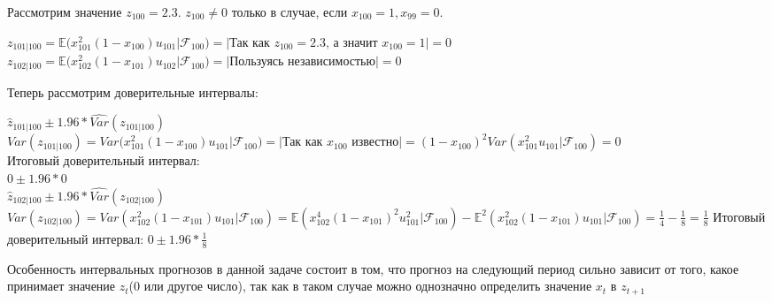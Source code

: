 \documentclass[a4paper,14pt]{article}
\begin{document}
\begin{enumerate}
\begin{enumerate}[label=\alph*)]
Рассмотрим значение $z_{100} = 2.3$. $z_{100}\neq 0$ только в случае, если $x_{100} = 1, x_{99} = 0$.
	\begin{spacing}{1.5}
		$z_{101|100} = \mathbb{E}(x^2_{101}(1-x_{100})u_{101}|\mathcal{F}_{100}) = |\texttt{Так как $z_{100} = 2.3$, а значит $x_{100} = 1$}| = 0$\\
		$z_{102|100} = \mathbb{E}(x^2_{102}(1-x_{101})u_{102}|\mathcal{F}_{100}) = |\texttt{Пользуясь независимостью}| = 0$
	\end{spacing}
Теперь рассмотрим доверительные интервалы:
	\begin{spacing}{1.5}
		$\hat{z}_{101|100} \pm 1.96*\hat{Var}(z_{101|100})$\\
		$Var(z_{101|100}) = Var(x^2_{101}(1-x_{100})u_{101}|\mathcal{F}_{100}) = |\texttt{Так как $x_{100}$ известно}| = (1-x_{100})^2Var(x^2_{101}u_{101}|\mathcal{F}_{100}) = 0$\\
		Итоговый доверительный интервал:\\
		$0 \pm 1.96*0$\\
		$\hat{z}_{102|100} \pm 1.96*\hat{Var}(z_{102|100})$\\
		$Var(z_{102|100}) = Var(x^2_{102}(1-x_{101})u_{101}|\mathcal{F}_{100}) = \mathbb{E}(x^4_{102}(1-x_{101})^2u^2_{101}|\mathcal{F}_{100}) - \mathbb{E}^2(x^2_{102}(1-x_{101})u_{101}|\mathcal{F}_{100}) = \frac{1}{4} - \frac{1}{8} = \frac{1}{8}$
		Итоговый доверительный интервал:
		$0 \pm 1.96*\frac{1}{8}$
	\end{spacing}
Особенность интервальных прогнозов в данной задаче состоит в том, что прогноз на следующий период сильно зависит от того, какое принимает значение $z_t$(0 или другое число), так как в таком случае можно однозначно определить значение $x_t$ в $z_{t+1}$
\end{enumerate}
\end{enumerate}
\end{document}
